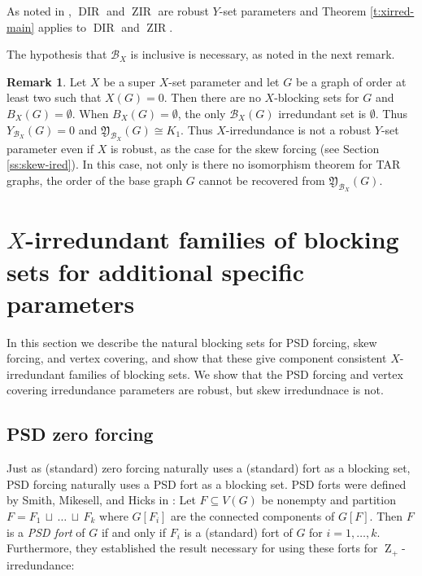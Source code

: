 \documentclass{article}
\numberwithin{figure}{section}
\numberwithin{table}{section}
\numberwithin{equation}{section}
\theoremstyle{definition}
\newtheorem{rem}[thm]{Remark}
\theoremstyle{definition}
\theoremstyle{definition}
\newcommand {\du} {\,\sqcup\,}
\newcommand{\B}{\mathcal{B}}
\newcommand{\Zp}{\operatorname{Z}_+}
\DeclareMathOperator{\DIR}{DIR}
\DeclareMathOperator{\ZIR}{ZIR}
\newcommand{\ytar}{\mathfrak{Y}}
\begin{document}
 As noted in \cite{XTAR-YTAR},  $\DIR$ and $\ZIR$ are robust $Y$-set parameters and Theorem \ref{t:xirred-main} applies to $\DIR$ and $\ZIR$.
 
 The hypothesis that $\B_X$ is inclusive is necessary, as noted in the next remark.

  \begin{rem}
    Let $X$ be a super $X$-set parameter and let $G$ be a graph  of order at least two such that $X(G)=0$. Then there are no $X$-blocking sets for $G$ and $B_X(G)=\emptyset$.  When 
$B_X(G)=\emptyset$, the only $\B_X(G)$ irredundant set is $\emptyset$.  Thus $Y_{\B_X}(G)=0$ and $\ytar_{\B_X}(G)\cong K_1$.  Thus $X$-irredundance is not a robust $Y$-set parameter even if $X$ is robust, as the case for the skew forcing (see Section \ref{ss:skew-ired}).  In this case, not only is there no isomorphism theorem for TAR graphs,  the order of the base graph $G$ cannot  be recovered from $\ytar_{\B_X}(G)$. 
 \end{rem}
 








\section{$X$-irredundant families of blocking sets  for additional specific parameters}\label{ss:block1x}



In this section we describe the natural blocking sets for  PSD forcing,  skew forcing, and vertex covering, and show that these give component consistent $X$-irredundant families of blocking sets. 
We show that the PSD  forcing and vertex covering irredundance parameters are robust, but skew irredundnace is not.




\subsection{PSD zero forcing}\label{ss:PSD-irred}

 Just as (standard) zero forcing naturally uses a (standard) fort as a blocking set, PSD forcing naturally uses a PSD fort as a blocking set.  PSD forts were defined by Smith, Mikesell, and Hicks in \cite{SMH19_PSDforts}: Let $F\subseteq V(G)$ be nonempty and partition $F=F_1\du\dots\du F_k$ where $G[F_i]$ are the connected components of $G[F]$.  Then $F$  is a \emph{PSD fort} of $G$ if and only if $F_i$ is a (standard) fort of $G$ for $i=1,\dots, k$.  Furthermore, they established the result necessary for using these forts for $\Zp$-irredundance:
\end{document}
